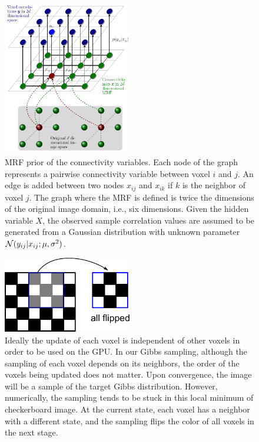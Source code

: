 \begin{figure}[p]
  \centering
  \includegraphics[width=0.5\textwidth]{figures/method1/6dmrf}
  \caption{MRF prior of the connectivity variables. Each node of the graph
    represents a pairwise connectivity variable between voxel $i$ and $j$. An
    edge is added between two nodes $x_{ij}$ and $x_{ik}$ if $k$ is the neighbor
    of voxel $j$. The graph where the MRF is defined is twice the dimensions
    of the original image domain, i.e., six dimensions. Given the hidden variable
    $X$, the observed sample correlation values are assumed to be generated
    from a Gaussian distribution with unknown parameter $\mathcal{N}(y_{ij} | x_{ij}; \mu,
    \sigma^2)$. }
  \label{fig:6dmrf}
\end{figure}

\begin{figure}[p]
  \centering
  \includegraphics[width=0.5\textwidth]{figures/method1/checkerboard}
  \caption{Ideally the update of each voxel is independent of other voxels in
    order to be used on the GPU. In our Gibbs sampling, although the sampling of
    each voxel depends on its neighbors, the order of the voxels being updated
    does not matter. Upon convergence, the image will be a sample of the target
    Gibbs distribution. However, numerically, the sampling tends to be stuck in
    this local minimum of checkerboard image. At the current state, each voxel has a
    neighbor with a different state, and the sampling flips the color
    of all voxels in the next stage.}
  \label{fig:checkerboard}
\end{figure}

